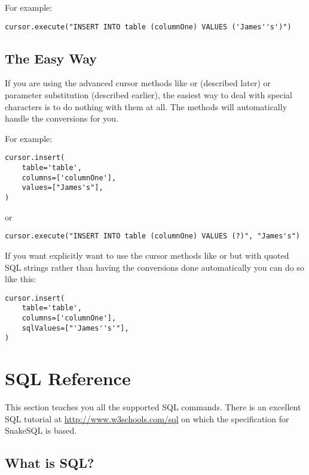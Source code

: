 \documentclass{howto}
\begin{document}
For example:

\begin{verbatim}
cursor.execute("INSERT INTO table (columnOne) VALUES ('James''s')")
\end{verbatim}

\subsection{The Easy Way}

If you are using the advanced cursor methods like  or  (described later) or parameter substitution (described earlier), the easiest way to deal with special characters is to do nothing with them at all. The methods will automatically handle the conversions for you.

For example:

\begin{verbatim}
cursor.insert(
    table='table',
    columns=['columnOne'],
    values=["James's"],
)
\end{verbatim}

or 

\begin{verbatim}
cursor.execute("INSERT INTO table (columnOne) VALUES (?)", "James's")
\end{verbatim}

If you want explicitly want to use the cursor methods like  or  but with quoted SQL strings rather than having the conversions done automatically you can do so like this:

\begin{verbatim}
cursor.insert(
    table='table',
    columns=['columnOne'],
    sqlValues=["'James''s'"],
)
\end{verbatim}

\section{SQL Reference}

This section teaches you all the supported SQL commands. There is an excellent SQL tutorial at \url{http://www.w3schools.com/sql} on which the specification for SnakeSQL is based.

\subsection{What is SQL?}
\end{document}
